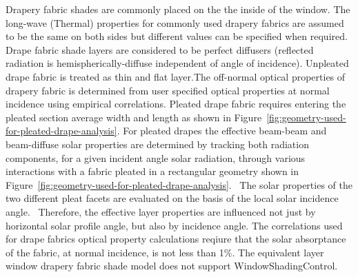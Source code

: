 Drapery fabric shades are commonly placed on the the inside of the window. The long-wave (Thermal) properties for commonly used drapery fabrics are assumed to be the same on both sides but different values can be specified when required. Drape fabric shade layers are considered to be perfect diffusers (reflected radiation is hemispherically-diffuse independent of angle of incidence). Unpleated drape fabric is treated as thin and flat layer.The off-normal optical properties of drapery fabric is determined from user specified optical properties at normal incidence using empirical correlations. Pleated drape fabric requires entering the pleated section average width and length as shown in Figure~\ref{fig:geometry-used-for-pleated-drape-analysis}. For pleated drapes the effective beam-beam and beam-diffuse solar properties are determined by tracking both radiation components, for a given incident angle solar radiation, through various interactions with a fabric pleated in a rectangular geometry shown in Figure~\ref{fig:geometry-used-for-pleated-drape-analysis}.~ The solar properties of the two different pleat facets are evaluated on the basis of the local solar incidence angle.~ Therefore, the effective layer properties are influenced not just by horizontal solar profile angle, but also by incidence angle. The correlations used for drape fabrics optical property calculations reqiure that the solar absorptance of the fabric, at normal incidence, is not less than 1\%. The equivalent layer window drapery fabric shade model does not support WindowShadingControl.

